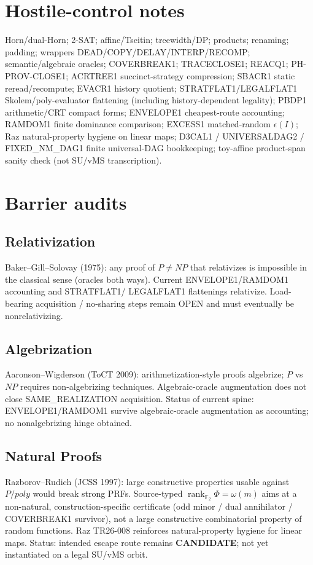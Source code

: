 \documentclass[11pt]{article}
\begin{document}
\section*{Hostile-control notes}
Horn/dual-Horn; 2-SAT; affine/Tseitin; treewidth/DP; products; renaming; padding;
wrappers DEAD/COPY/DELAY/INTERP/RECOMP; semantic/algebraic oracles; COVERBREAK1;
TRACECLOSE1; REACQ1; PH-PROV-CLOSE1; ACRTREE1 succinct-strategy compression; SBACR1
static reread/recompute; EVACR1 history quotient; STRATFLAT1/LEGALFLAT1 Skolem/poly-evaluator
flattening (including history-dependent legality); PBDP1 arithmetic/CRT compact forms;
ENVELOPE1 cheapest-route accounting; RAMDOM1 finite dominance comparison; EXCESS1
matched-random $\epsilon(I)$; Raz natural-property hygiene on linear maps; D3CAL1 /
UNIVERSALDAG2 / FIXED\_NM\_DAG1 finite universal-DAG bookkeeping; toy-affine product-span
sanity check (not SU/vMS transcription).

\section*{Barrier audits}
\subsection*{Relativization}
Baker--Gill--Solovay (1975): any proof of $P\neq NP$ that relativizes is impossible in the
classical sense (oracles both ways). Current ENVELOPE1/RAMDOM1 accounting and STRATFLAT1/
LEGALFLAT1 flattenings relativize. Load-bearing acquisition / no-sharing steps remain OPEN
and must eventually be nonrelativizing.
\subsection*{Algebrization}
Aaronson--Wigderson (ToCT 2009): arithmetization-style proofs algebrize; $P$ vs $NP$ requires
non-algebrizing techniques. Algebraic-oracle augmentation does not close SAME\_REALIZATION
acquisition. Status of current spine: ENVELOPE1/RAMDOM1 survive algebraic-oracle
augmentation as accounting; no nonalgebrizing hinge obtained.
\subsection*{Natural Proofs}
Razborov--Rudich (JCSS 1997): large constructive properties usable against $P/poly$ would
break strong PRFs. Source-typed $\operatorname{rank}_{\mathbb F_2}\Phi=\omega(m)$ aims at a
non-natural, construction-specific certificate (odd minor / dual annihilator / COVERBREAK1
survivor), not a large constructive combinatorial property of random functions. Raz TR26-008
reinforces natural-property hygiene for linear maps. Status: intended escape route remains
\textbf{CANDIDATE}; not yet instantiated on a legal SU/vMS orbit.
\end{document}
